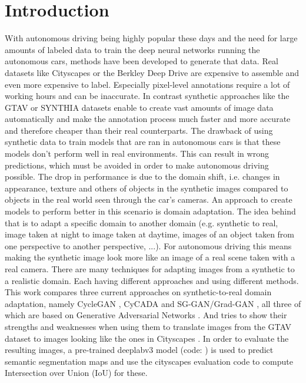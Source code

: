 \chapter{Introduction}

With autonomous driving being highly popular these days and the need for large amounts of labeled data to train the deep neural networks running the autonomous cars, methods have been developed to generate that data. Real datasets like Cityscapes \cite{Cordts_2016_CVPR} or the Berkley Deep Drive \cite{DBLP:journals/corr/abs-1805-04687} are expensive to assemble and even more expensive to label. Especially pixel-level annotations require a lot of working hours and can be inaccurate. In contrast synthetic approaches like the GTAV \cite{Richter_2016_ECCV} or SYNTHIA datasets \cite{RosCVPR16} enable to create vast amounts of image data automatically and make the annotation process much faster and more accurate and therefore cheaper than their real counterparts. The drawback of using synthetic data to train models that are ran in autonomous cars is that these models don't perform well in real environments. This can result in wrong predictions, which must be avoided in order to make autonomous driving possible. The drop in performance is due to the domain shift, i.e. changes in appearance, texture and others of objects in the synthetic images compared to objects in the real world seen through the car's cameras. An approach to create models to perform better in this scenario is domain adaptation. The idea behind that is to adapt a specific domain to another domain (e.g. synthetic to real, image taken at night to image taken at daytime, images of an object taken from one perspective to another perspective, ...). For autonomous driving this means making the synthetic image look more like an image of a real scene taken with a real camera. There are many techniques for adapting images from a synthetic to a realistic domain. Each having different approaches and using different methods. This work compares three current approaches on synthetic-to-real domain adaptation, namely CycleGAN \cite{DBLP:journals/corr/ZhuPIE17}, CyCADA \cite{DBLP:journals/corr/abs-1711-03213} and SG-GAN/Grad-GAN \cite{DBLP:journals/corr/abs-1801-01726}, all three of which are based on Generative Adversarial Networks \cite{NIPS2014_5423}. And tries to show their strengths and weaknesses when using them to translate images from the GTAV dataset \cite{Richter_2016_ECCV} to images looking like the ones in Cityscapes \cite{Cordts_2016_CVPR}. In order to evaluate the resulting images, a pre-trained deeplabv3 \cite{DBLP:journals/corr/ChenPSA17} model (code: \cite{DLR}) is used to predict semantic segmentation maps and use the cityscapes evaluation code \cite{CSR} to compute Intersection over Union (IoU) for these. 